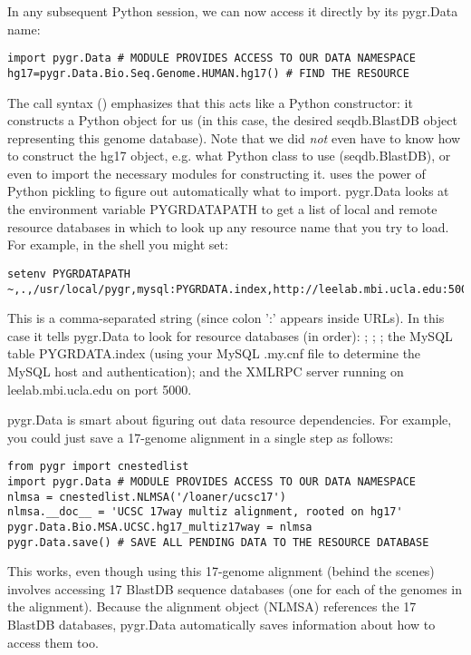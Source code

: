 \documentclass{howto}
\begin{document}
In any subsequent Python session, we can now access it directly by its
pygr.Data name:
\begin{verbatim}
import pygr.Data # MODULE PROVIDES ACCESS TO OUR DATA NAMESPACE
hg17=pygr.Data.Bio.Seq.Genome.HUMAN.hg17() # FIND THE RESOURCE
\end{verbatim}
The call syntax () emphasizes that this acts like a Python
constructor: it constructs a Python object for us (in this case, the
desired seqdb.BlastDB object representing this genome database).
Note that we did {\em not} even have to know how to construct the hg17 
object, e.g. what Python class to use (seqdb.BlastDB), or even to import
the necessary modules for constructing it.   uses the
power of Python pickling to figure out automatically what to import.
pygr.Data looks at the environment variable PYGRDATAPATH to get a list 
of local and remote resource databases in which to look up any resource name
that you try to load.  For example, in the shell you might set:
\begin{verbatim}
setenv PYGRDATAPATH ~,.,/usr/local/pygr,mysql:PYGRDATA.index,http://leelab.mbi.ucla.edu:5000
\end{verbatim}
This is a comma-separated string (since colon ':' appears inside URLs).
In this case it tells pygr.Data to look for resource databases (in order):
; ; ;
the MySQL table PYGRDATA.index (using your
MySQL .my.cnf file to determine the MySQL host and authentication);
and the XMLRPC server running on leelab.mbi.ucla.edu on port 5000.

pygr.Data is smart about figuring out data resource dependencies.
For example, you could just save a 17-genome alignment in a single step
as follows:
\begin{verbatim}
from pygr import cnestedlist
import pygr.Data # MODULE PROVIDES ACCESS TO OUR DATA NAMESPACE
nlmsa = cnestedlist.NLMSA('/loaner/ucsc17')
nlmsa.__doc__ = 'UCSC 17way multiz alignment, rooted on hg17'
pygr.Data.Bio.MSA.UCSC.hg17_multiz17way = nlmsa
pygr.Data.save() # SAVE ALL PENDING DATA TO THE RESOURCE DATABASE
\end{verbatim}
This works, even though using this 17-genome alignment (behind the
scenes) involves accessing 17 BlastDB sequence databases (one for each
of the genomes in the alignment).  Because the alignment object (NLMSA)
references the 17 BlastDB databases, pygr.Data automatically saves information
about how to access them too.
\end{document}
